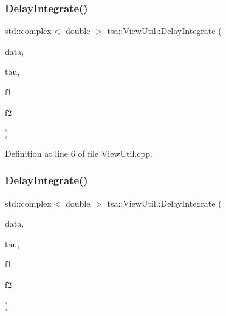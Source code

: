 \mbox{\label{classtsa_1_1_view_util_afdc977e523a31a8f009fb338d7f9937f}} 
\subsubsection{\texorpdfstring{Delay\+Integrate()}{DelayIntegrate()}\hspace{0.1cm}{\footnotesize\ttfamily [1/2]}}
{\footnotesize\ttfamily std\+::complex$<$ double $>$ tsa\+::\+View\+Util\+::\+Delay\+Integrate (\begin{DoxyParamCaption}\item[{\hyperlink{namespacetsa_ab32775c889b53c40fa83939f22372b75}{Seq\+View\+Complex} \&}]{data,  }\item[{double}]{tau,  }\item[{double}]{f1,  }\item[{double}]{f2 }\end{DoxyParamCaption})\hspace{0.3cm}{\ttfamily [static]}}



Definition at line 6 of file View\+Util.\+cpp.

\mbox{\label{classtsa_1_1_view_util_a05ade4e87492c28990eaa5d59f023e74}} 
\subsubsection{\texorpdfstring{Delay\+Integrate()}{DelayIntegrate()}\hspace{0.1cm}{\footnotesize\ttfamily [2/2]}}
{\footnotesize\ttfamily std\+::complex$<$ double $>$ tsa\+::\+View\+Util\+::\+Delay\+Integrate (\begin{DoxyParamCaption}\item[{\hyperlink{namespacetsa_ac599574bcc094eda25613724b8f3ca9e}{Seq\+View\+Double} \&}]{data,  }\item[{double}]{tau,  }\item[{double}]{f1,  }\item[{double}]{f2 }\end{DoxyParamCaption})\hspace{0.3cm}{\ttfamily [static]}}



